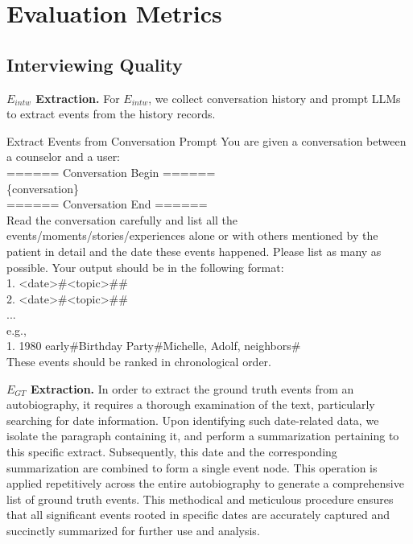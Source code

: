 \section{Evaluation Metrics}
\subsection{Interviewing Quality}\label{appendix:interviewing_coverage}

\noindent\textbf{$E_{intw}$ Extraction.} For $E_{intw}$, we collect conversation history and prompt LLMs to extract events from the history records.


\begin{myboxcross}{Extract Events from Conversation Prompt}
You are given a conversation between a counselor and a user: \\
====== Conversation Begin ======  \\
\{conversation\} \\
====== Conversation End ======  \\
Read the conversation carefully and list all the events/moments/stories/experiences alone or with others mentioned by the patient in detail and the date these events happened. Please list as many as possible. Your output should be in the following format: \\
1. <date>\#<topic>\#<people-involved>\#<description in detail> \\
2. <date>\#<topic>\#<people-involved>\#<description in detail> \\
... \\
e.g., \\
1. 1980 early\#Birthday Party\#Michelle, Adolf, neighbors\#<descriptions of this party in detail> \\
These events should be ranked in chronological order. \\
\end{myboxcross}

\noindent\textbf{$E_{GT}$ Extraction.} In order to extract the ground truth events from an autobiography, it requires a thorough examination of the text, particularly searching for date information. Upon identifying such date-related data, we isolate the paragraph containing it, and perform a summarization pertaining to this specific extract. Subsequently, this date and the corresponding summarization are combined to form a single event node. This operation is applied repetitively across the entire autobiography to generate a comprehensive list of ground truth events. This methodical and meticulous procedure ensures that all significant events rooted in specific dates are accurately captured and succinctly summarized for further use and analysis.

